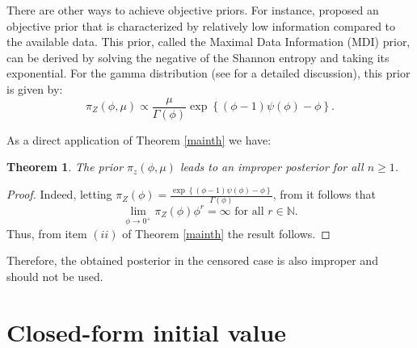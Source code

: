 \documentclass[12pt]{article} %
\theoremstyle{plain}%
\newtheorem{theorem}{Theorem}[section]
\theoremstyle{definition}
\theoremstyle{remark}
\begin{document}
There are other ways to achieve objective priors. For instance, \cite{zellner1,zellner2} proposed an objective prior that is characterized by relatively low information compared to the available data. This prior, called the Maximal Data Information (MDI) prior, can be derived by solving the negative of the Shannon entropy and taking its exponential. For the gamma distribution (see  \cite{ramos2020posterior} for a detailed discussion), this prior is given by:
\begin{equation*}%
\pi_Z(\phi, \mu)\propto\frac{\mu}{\Gamma(\phi)}\exp\left\{(\phi-1)\psi(\phi)-\phi\right\}.
\end{equation*}

As a direct application of Theorem \ref{mainth} we have:
\begin{theorem} The prior $\pi_z(\phi,\mu)$ leads to an improper posterior for all $n\geq 1$.
\end{theorem}
\begin{proof} Indeed,  letting $\pi_Z(\phi) = \frac{\exp\left\{(\phi-1)\psi(\phi)-\phi\right\}}{\Gamma(\phi)}$, from \cite{ramos2021posterior} it follows that 
\begin{equation*} \lim_{\phi\to 0^+}\pi_Z(\phi)\phi^r = \infty\mbox{ for all }r\in \mathbb{N}.
\end{equation*}
Thus, from item $(ii)$ of Theorem \ref{mainth} the result follows.
\end{proof}
Therefore, the obtained posterior in the censored case is also improper and should not be used.



\section{Closed-form initial value}
\end{document}
